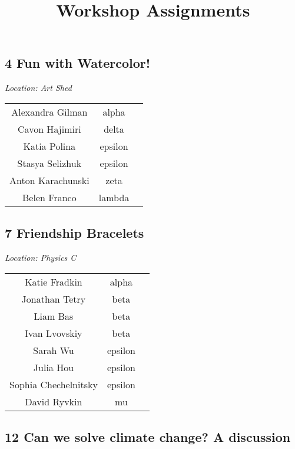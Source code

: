 \documentclass{article}
\title{Workshop Assignments}
\author{}
\date{}
\begin{document}
\maketitle
\begin{center}
\section*{4 Fun with Watercolor!}
\end{center}
\begin{center}
\textit{Location: Art Shed}
\end{center}
\setlength{\tabcolsep}{60pt}
\centering
\begin{tabular}{c c c}
Alexandra Gilman & alpha \\
Cavon Hajimiri & delta \\
Katia Polina & epsilon \\
Stasya Selizhuk & epsilon \\
Anton Karachunski & zeta \\
Belen Franco & lambda \\
\end{tabular}
\begin{center}
\section*{7 Friendship Bracelets}
\end{center}
\begin{center}
\textit{Location: Physics C}
\end{center}
\setlength{\tabcolsep}{60pt}
\centering
\begin{tabular}{c c c}
Katie Fradkin & alpha \\
Jonathan Tetry & beta \\
Liam Bas & beta \\
Ivan Lvovskiy & beta \\
Sarah Wu & epsilon \\
Julia Hou & epsilon \\
Sophia Chechelnitsky & epsilon \\
David Ryvkin & mu \\
\end{tabular}
\begin{center}
\section*{12 Can we solve climate change? A discussion}
\end{center}
\end{document}
